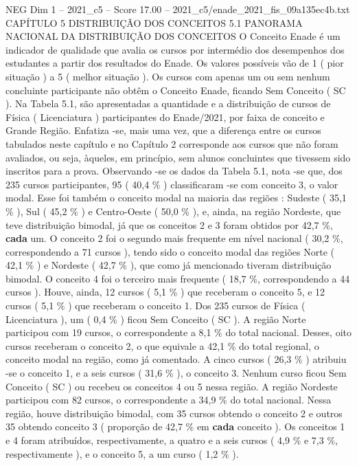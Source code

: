 \begin{textsample}{NEG Dim 1 – 2021\_c5 – Score 17.00 – 2021\_c5/enade\_2021\_fis\_09a135ec4b.txt}  \label{ex:f1_neg_406}
CAPÍTULO 5 DISTRIBUIÇÃO DOS CONCEITOS 5.1 PANORAMA NACIONAL DA DISTRIBUIÇÃO DOS CONCEITOS O Conceito Enade é um indicador de qualidade que avalia os cursos por intermédio dos desempenhos dos estudantes a partir dos resultados do Enade.
Os valores possíveis vão de 1 ( pior situação ) a 5 ( melhor situação ).
Os cursos com apenas um ou sem nenhum concluinte participante não obtêm o Conceito Enade, ficando Sem Conceito ( SC ).
Na Tabela 5.1, são apresentadas a quantidade e a distribuição de cursos de Física ( Licenciatura ) participantes do Enade/2021, por faixa de conceito e Grande Região.
Enfatiza -se, mais uma vez, que a diferença entre os cursos tabulados neste capítulo e no Capítulo 2 corresponde aos cursos que não foram avaliados, ou seja, àqueles, em princípio, sem alunos concluintes que tivessem sido inscritos para a prova.
Observando -se os dados da Tabela 5.1, nota -se que, dos 235 cursos participantes, 95 ( 40,4 \% ) classificaram -se com conceito 3, o valor modal.
Esse foi também o conceito modal na maioria das regiões : Sudeste ( 35,1 \% ), Sul ( 45,2 \% ) e Centro-Oeste ( 50,0 \% ), e, ainda, na região Nordeste, que teve distribuição bimodal, já que os conceitos 2 e 3 foram obtidos por 42,7 \%, \textbf{cada} um.
O conceito 2 foi o segundo mais frequente em nível nacional ( 30,2 \%, correspondendo a 71 cursos ), tendo sido o conceito modal das regiões Norte ( 42,1 \% ) e Nordeste ( 42,7 \% ), que como já mencionado tiveram distribuição bimodal.
O conceito 4 foi o terceiro mais frequente ( 18,7 \%, correspondendo a 44 cursos ).
Houve, ainda, 12 cursos ( 5,1 \% ) que receberam o conceito 5, e 12 cursos ( 5,1 \% ) que receberam o conceito 1.
Dos 235 cursos de Física ( Licenciatura ), um ( 0,4 \% ) ficou Sem Conceito ( SC ).
A região Norte participou com 19 cursos, o correspondente a 8,1 \% do total nacional.
Desses, oito cursos receberam o conceito 2, o que equivale a 42,1 \% do total regional, o conceito modal na região, como já comentado.
A cinco cursos ( 26,3 \% ) atribuiu -se o conceito 1, e a seis cursos ( 31,6 \% ), o conceito 3.
Nenhum curso ficou Sem Conceito ( SC ) ou recebeu os conceitos 4 ou 5 nessa região.
A região Nordeste participou com 82 cursos, o correspondente a 34,9 \% do total nacional.
Nessa região, houve distribuição bimodal, com 35 cursos obtendo o conceito 2 e outros 35 obtendo conceito 3 ( proporção de 42,7 \% em \textbf{cada} conceito ).
Os conceitos 1 e 4 foram atribuídos, respectivamente, a quatro e a seis cursos ( 4,9 \% e 7,3 \%, respectivamente ), e o conceito 5, a um curso ( 1,2 \% ).

\end{textsample}
